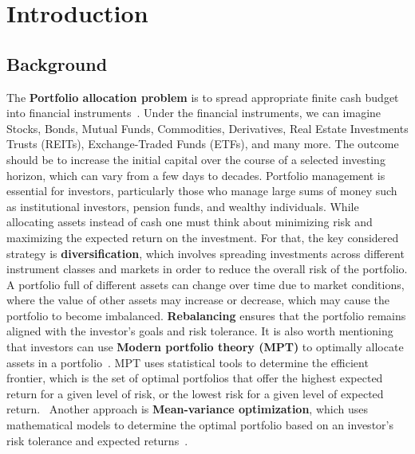 

\chapter{Introduction}\label{ch:introduction}


\section{Background}\label{sec:background}
The \textbf{Portfolio allocation problem} is to spread appropriate finite cash budget into financial instruments~\cite{Model-Free-Reinforcement-Learning-for-Asset-Allocation}.
Under the financial instruments, we can imagine Stocks, Bonds, Mutual Funds, Commodities, Derivatives, Real Estate Investments Trusts (REITs), Exchange-Traded Funds (ETFs), and many more.
The outcome should be to increase the initial capital over the course of a selected investing horizon, which can vary from a few days to decades.
Portfolio management is essential for investors, particularly those who manage large sums of money such as institutional investors, pension funds, and wealthy individuals.
While allocating assets instead of cash one must think about minimizing risk and maximizing the expected return on the investment.
For that, the key considered strategy is \textbf{diversification}, which involves spreading investments across different instrument classes and markets in order to reduce the overall risk of the portfolio.
A portfolio full of different assets can change over time due to market conditions, where the value of other assets may increase or decrease, which may cause the portfolio to become imbalanced.
\textbf{Rebalancing} ensures that the portfolio remains aligned with the investor's goals and risk tolerance.
It is also worth mentioning that investors can use \textbf{Modern portfolio theory (MPT)} to optimally allocate assets in a portfolio~\cite{modern-portfolio-theory}.
MPT uses statistical tools to determine the efficient frontier, which is the set of optimal portfolios that offer the highest expected return for a given level of risk, or the lowest risk for a given level of expected return.~\cite{sirucek-2015}
Another approach is \textbf{Mean-variance optimization}, which uses mathematical models to determine the optimal portfolio based on an investor's risk tolerance and expected returns~\cite{meanvarianceportfoliooptimazation}.

